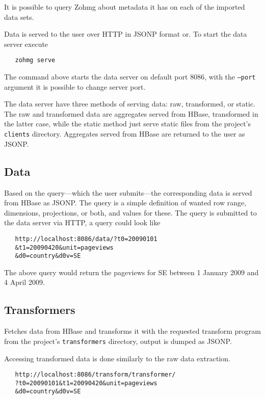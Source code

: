It is possible to query Zohmg about metadata it has on each of the imported
data sets.

Data is served to the user over HTTP in JSONP format or. To start the data
server execute

\begin{verbatim}
   zohmg serve
\end{verbatim}

The command above starts the data server on default port 8086, with the
\texttt{--port} argument it is possible to change server port.

The data server have three methods of serving data: raw, transformed, or
static. The raw and transformed data are aggregates served from HBase,
transformed in the latter case, while the static method just serve static
files from the project's \texttt{clients} directory. Aggregates served from
HBase are returned to the user as JSONP.


\subsection*{Data}

Based on the query---which the user submits---the corresponding data is
served from HBase as JSONP. The query is a simple definition of wanted row
range, dimensions, projections, or both, and values for these. The query is
submitted to the data server via HTTP, a query could look like

\begin{verbatim}
   http://localhost:8086/data/?t0=20090101
   &t1=20090420&unit=pageviews
   &d0=country&d0v=SE
\end{verbatim}

\noindent The above query would return the pageviews for SE between 1 January
2009 and 4 April 2009.


\subsection*{Transformers}

Fetches data from HBase and transforms it with the requested transform
program from the project's \texttt{transformers} directory, output is
dumped as JSONP.

Accessing transformed data is done similarly to the raw data extraction.

\begin{verbatim}
   http://localhost:8086/transform/transformer/
   ?t0=20090101&t1=20090420&unit=pageviews
   &d0=country&d0v=SE
\end{verbatim}

